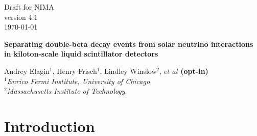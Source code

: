 \documentclass[12pt,twoside,letterpaper]{article}
\newcommand{\vbb}{0\nu\beta\beta}
\newcommand{\B}{^{8}B}
\begin{document}
\vspace*{-3.5cm}
\begin{flushright}
Draft for NIMA\\
version 4.1\\
\today
\end{flushright}



\begin{center}
  \begin{Large}
  {\bf Separating double-beta decay events from solar neutrino interactions in kiloton-scale liquid scintillator detectors}
  \end{Large}
\end{center}


\begin{center}
Andrey Elagin$^1$, Henry Frisch$^1$, Lindley Winslow$^2$, $et$ $al$ {\bf (opt-in)}\\
\emph{$^1$Enrico Fermi Institute, University of Chicago\\ 
$^2$Massachusetts Institute of Technology}
\end{center}



\begin{abstract}
We propose a technique for separating $\vbb$-decay events from background due to $\B$ solar neutrino interactions in a liquid scintillator detector. The technique compares event topology of the signal and background events using spherical harmonics analysis of the early light emitted in $\vbb$-decay and $\B$ events. Selection of early photons using fast photo-detectors allows for separation of directional Cherenkov from isotropic scintillation light and identification of two event topologies based on the spatial distribution of the early photons in the detector.
\end{abstract}

\newpage
\tableofcontents
\newpage





\section{Introduction}
\end{document}
